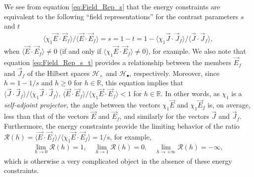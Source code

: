 \documentclass{cmslatex}
\begin{document}
 We see from equation \eqref{eq:Field_Rep_s} that the energy
 constraints are equivalent to the following ``field representations''
 for the contrast parameters $s$ and $t$
%
\begin{align}\label{eq:Field_Rep_s_t}
  \langle\chi_1\vec{E}\cdot\vec{E}_f\rangle/\langle\vec{E}\cdot\vec{E}_f\rangle
  =s=1-t
  =1- \langle\chi_1\vec{J}\cdot\vec{J}_f\rangle/\langle\vec{J}\cdot\vec{J}_f\rangle,
\end{align}
%
when $\langle\vec{E}\cdot\vec{E}_f\rangle\neq0$ (if and only if
$\langle\chi_1\vec{E}\cdot\vec{E}_f\rangle\neq0$), for example. We also note that equation 
\eqref{eq:Field_Rep_s_t} provides a relationship between the
members $\vec{E}_f$ and $\vec{J}_f$ of the Hilbert spaces
$\mathscr{H}_\times$ and $\mathscr{H}_{\bullet}$, respectively. Moreover, since
$h=1-1/s$ and $h\geq0$ for $h\in\mathbb{R}$, this equation implies
that $\langle\vec{J}\cdot\vec{J}_f\rangle/\langle\chi_1\vec{J}\cdot\vec{J}_f\rangle,\,
\langle\vec{E}\cdot\vec{E}_f\rangle/\langle\chi_1\vec{E}\cdot\vec{E}_f\rangle<1$ for 
$h\in\mathbb{R}$. In other words, as $\chi_1$ is a \emph{self-adjoint
  projector}, the angle between the vectors $\chi_1\vec{E}$ and
$\chi_1\vec{E}_f$ is, on average, less than that of the vectors
$\vec{E}$ and $\vec{E}_f$, and similarly for the vectors $\vec{J}$ and
$\vec{J}_f$. Furthermore, the energy constraints provide the limiting
behavior of the ratio
$\mathcal{R}(h)=\langle\vec{E}\cdot\vec{E}_f\rangle/\langle\chi_1\vec{E}\cdot\vec{E}_f\rangle=1/s$, for
example,    
%
\begin{align}
  \lim_{h\to0}\mathcal{R}(h)=1, \quad
  \lim_{h\to1}\mathcal{R}(h)=0, \quad
  \lim_{h\to+\infty}\mathcal{R}(h)=-\infty,
\end{align}
%
which is otherwise a very complicated object in the absence of these
energy constraints.
\end{document}
